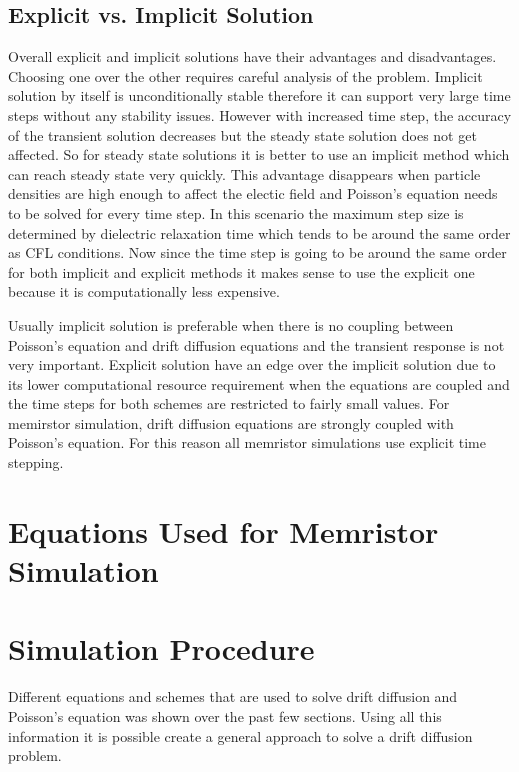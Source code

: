 \begin{doublespace}
\subsection{Explicit vs. Implicit Solution}

Overall explicit and implicit solutions have their advantages and disadvantages. Choosing one over the other requires careful analysis of the problem. Implicit solution by itself is unconditionally stable therefore it can support very large time steps without any stability issues. However with increased time step, the accuracy of the transient solution decreases but the steady state solution does not get affected. So for steady state solutions it is better to use an implicit method which can reach steady state very quickly. This advantage disappears when particle densities are high enough to affect the electic field and Poisson's equation needs to be solved for every time step. In this scenario the maximum step size is determined by dielectric relaxation time which tends to be around the same order as CFL conditions. Now since the time step is going to be around the same order for both implicit and explicit methods it makes sense to use the explicit one because it is computationally less expensive.

Usually implicit solution is preferable when there is no coupling between Poisson's equation and drift diffusion equations and the transient response is not very important. Explicit solution have an edge over the implicit solution due to its lower computational resource requirement when the equations are coupled and the time steps for both schemes are restricted to fairly small values. For memirstor simulation, drift diffusion equations are strongly coupled with Poisson's equation. For this reason all memristor simulations use explicit time stepping. 

\clearpage
\section{Equations Used for Memristor Simulation}


\clearpage
\section{Simulation Procedure}
Different equations and schemes that are used to solve drift diffusion and Poisson's equation was shown over the past few sections. Using all this information it is possible create a general approach to solve a drift diffusion problem. 


\end{doublespace}
